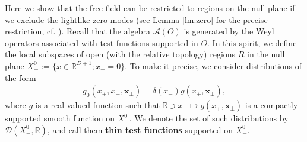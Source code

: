 \documentclass[12pt]{article}
\def\RR{{\mathbb R}}
\def\A{{\mathcal A}}
\def\tx{\pmb{x}}
\theoremstyle{remark}
\begin{document}
 Here we show that the free field can be restricted to regions on the null plane if we exclude the lightlike zero-modes
 (see Lemma \ref{lm:zero} for the precise restriction, cf.\! \cite{Ullrich04}).
 Recall that the algebra $\A(O)$ is generated by the Weyl operators associated with test functions supported in $O$.
 In this spirit, we define the local subspaces of open (with the relative topology) regions $R$ in the null plane $X_-^0:=\{x\in \RR^{D+1};x_-=0\}$. 
 To make it precise, we consider distributions of the form 
  \begin{align}
    g_0(x_+,x_-,\pmb{x}_\perp)=\delta(x_-)g(x_+,\pmb{x}_\perp), \label{simple-test-function-on-null-plane}
   \end{align}
  where $g$ is a real-valued function such  that $\RR\ni x_+\mapsto g(x_+,\tx_\perp)$ is a compactly supported smooth function on $X_-^0$.
  We denote the set of such distributions by $\mathscr{D}(X_-^0,\RR)$,
  and call them \textbf{thin test functions} supported on $X_-^0$.
\end{document}
